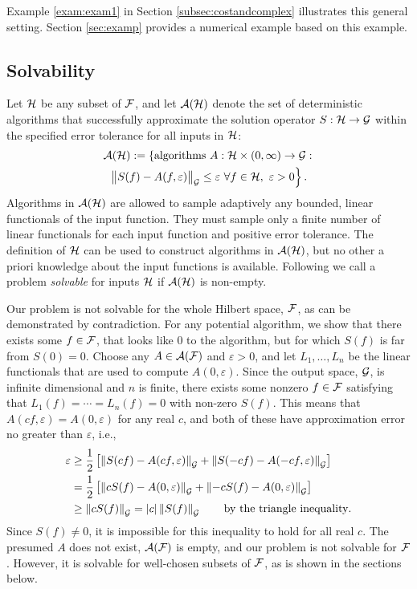 \documentclass[graybox,footinfo]{svmult}
\newcommand{\DHJRnorm}[2][{}]{\ensuremath{\left \lVert #2 \right \rVert}_{#1}}
\newcommand{\DHJRbignorm}[2][{}]{\ensuremath{\bigl \lVert #2 \bigr \rVert}_{#1}}
\newcommand{\DHJRabs}[1]{\ensuremath{{\left \lvert #1 \right \rvert}}}
\begin{document}
Example \ref{exam:exam1} in Section \ref{subsec:costandcomplex} illustrates this general setting.  Section \ref{sec:examp} provides a numerical example based on this example.

\subsection{Solvability}  Let ${\mathcal{H}}$ be any subset of ${\mathcal{F}}$, and let ${\mathcal{A}}({\mathcal{H}})$ denote the set of deterministic algorithms that successfully approximate the solution operator $S : {\mathcal{H}} \to {\mathcal{G}}$ within the specified error tolerance for all inputs in ${\mathcal{H}}$:
\begin{multline} \label{adapErrCrit}
\calA(\calH) : = \left\{ \text{algorithms } A:\calH \times (0,\infty) \rightarrow \calG : 
\right . \\ \left .
\DHJRbignorm[\calG]{S(f) - A(f,\varepsilon)} \le \varepsilon \ \forall f \in \calH, \ \varepsilon > 0 
\right \}.
\end{multline}
Algorithms in ${\mathcal{A}}({\mathcal{H}})$ are allowed to sample adaptively any bounded, linear functionals
of the input function.  They must sample only a finite number of linear functionals for each input function and positive error tolerance.  The definition of ${\mathcal{H}}$ can be used to construct algorithms in ${\mathcal{A}}({\mathcal{H}})$, but no other a priori knowledge about the input functions is available.  Following \cite{KunEtal19a} we call a problem \emph{solvable} for inputs ${\mathcal{H}}$ if ${\mathcal{A}}({\mathcal{H}})$ is non-empty.

Our problem is not solvable for the whole Hilbert space, ${\mathcal{F}}$, as can be demonstrated by contradiction. For any potential algorithm, we show that there exists some $f \in {\mathcal{F}}$, that looks like $0$ to the algorithm, but for which $S(f)$ is far from $S(0) = 0$.   Choose any $A \in {\mathcal{A}}({\mathcal{F}})$ and $\varepsilon > 0$, and let $L_1, \ldots, L_n$ be the linear functionals that are used to compute $A(0,\varepsilon)$. Since the output space, ${\mathcal{G}}$, is infinite dimensional and $n$ is finite, there exists some nonzero $f \in {\mathcal{F}}$ satisfying that $L_1(f) = \cdots = L_n(f) = 0$ with non-zero $S(f)$. This means that $A(cf,\varepsilon) = A(0,\varepsilon)$ for any real $c$, and both of these have approximation error no greater than $\varepsilon$, i.e.,
\begin{align*}
    \varepsilon &\ge \frac 12 \left[ \DHJRnorm[\calG]{S(cf) - A(cf,\varepsilon)} + \DHJRnorm[\calG]{S(-cf) - A(-cf,\varepsilon)}\right] \\
    & =  \frac 12 \left[ \DHJRnorm[\calG]{cS(f) - A(0,\varepsilon)} + \DHJRnorm[\calG]{-cS(f) - A(0,\varepsilon)}\right] \\
    & \ge  \DHJRnorm[\calG]{cS(f)} = \DHJRabs{c}\DHJRnorm[\calG]{S(f)}  \qquad \text{by the triangle inequality}.
\end{align*}
Since $S(f) \ne 0$, it is impossible for this inequality to hold for all real $c$.  The presumed $A$ does not exist, ${\mathcal{A}}({\mathcal{F}})$ is empty, and our problem is not solvable for ${\mathcal{F}}$. However, it is solvable for well-chosen subsets of ${\mathcal{F}}$, as is shown in the sections below.
\end{document}
